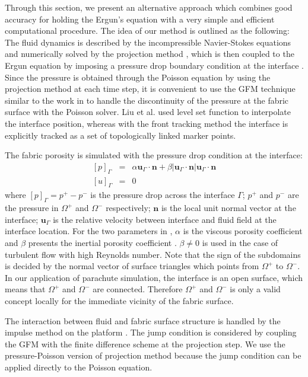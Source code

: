 Through this section, we present an alternative approach which combines 
good accuracy for holding the Ergun's equation with a very simple and efficient 
computational procedure. The idea of our method is 
outlined as the following: The fluid dynamics is 
described by the incompressible Navier-Stokes equations and numerically 
solved by the projection method \cite{Kim1985Application}, 
which is then coupled to the Ergun equation \cite{Nield2013} by imposing a pressure drop boundary condition at the interface \cite{caiazzo2011}. Since the pressure is obtained 
through the Poisson equation by using the projection method at each time step, 
it is convenient to use the GFM technique similar to the work in 
\cite{fedkiw1999,kang2000boundary,liu2000boundary} to handle the 
discontinuity of the pressure at the fabric surface with the Poisson 
solver. Liu et al. \cite{liu2000boundary} used level set function to 
interpolate the interface position, whereas with the front tracking method 
the interface is explicitly tracked as a set of topologically linked marker points.

The fabric porosity is simulated with the pressure drop condition at the interface:
\begin{eqnarray} \label{jumpcond} {[p]}_{\Gamma} &=& \alpha
\mathbf{u}_\Gamma\cdot \mathbf{n} + \beta |\mathbf{u}_\Gamma\cdot \mathbf{n}|
\mathbf{u}_\Gamma\cdot \mathbf{n} \\
{[u]}_{\Gamma} &=& 0 \end{eqnarray}
where $[p]_{\Gamma}=p^+ - p^-$ is the
pressure drop across the interface $\Gamma$; $p^+$ and $p^-$ are the pressure in
$\Omega^+$ and $\Omega^-$ respectively; $\mathbf{n}$ is the local unit normal
vector at the interface; $\mathbf{u}_\Gamma$ is the relative velocity between
interface and fluid field at the interface location. For the two parameters in
, $\alpha$ is the viscous porosity coefficient and $\beta$ presents
the inertial porosity coefficient \cite{wang2006porous}. $\beta \neq 0$ is used in the case of
turbulent flow with high Reynolds number.  Note that the sign of the subdomains
is decided by the normal vector of surface triangles which points from
$\Omega^+$ to $\Omega^-$.  In our application of parachute simulation, the
interface is an open surface, which means that $\Omega^+$ and $\Omega^-$ are
connected. Therefore $\Omega^+$ and $\Omega^-$ is only a valid concept locally
for the immediate vicinity of the fabric surface.

The interaction between fluid and fabric surface structure is handled by the
impulse method \cite{KimLiLi12} on the \FronTierp platform \cite{BoFixGli07}. 
The jump condition
 is considered by coupling the GFM with the finite difference
scheme at the projection step. We use the pressure-Poisson version of
projection method because the jump condition can be applied directly to the
Poisson equation.

